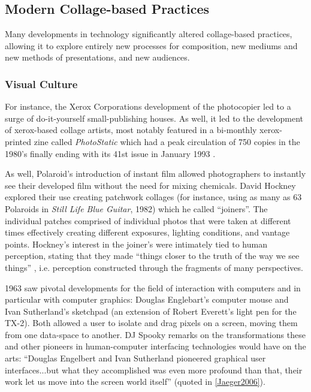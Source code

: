 \documentclass[a4paper,10pt,final]{ThesisStyle}
\begin{document}
\subsection{Modern Collage-based Practices}
Many developments in technology significantly altered collage-based practices, allowing it to explore entirely new processes for composition, new mediums and new methods of presentations, and new audiences. 

\subsubsection{Visual Culture}
For instance, the Xerox Corporations development of the photocopier led to a surge of do-it-yourself small-publishing houses.  As well, it led to the development of xerox-based collage artists, most notably featured in a bi-monthly xerox-printed zine called \textit{PhotoStatic} which had a peak circulation of 750 copies in the 1980's finally ending with its 41st issue in January 1993 \cite{McLeod2011}.  

As well, Polaroid's introduction of instant film allowed photographers to instantly see their developed film without the need for mixing chemicals.  David Hockney explored their use creating patchwork collages (for instance, using as many as 63 Polaroids in \textit{Still Life Blue Guitar}, 1982) which he called ``joiners''.  The individual patches comprised of individual photos that were taken at different times effectively creating different exposures, lighting conditions, and vantage points.  Hockney's interest in the joiner's were intimately tied to human perception, stating that they made ``things closer to the truth of the way we see things'' \cite{Joyce1988}, i.e. perception constructed through the fragments of many perspectives.

1963 saw pivotal developments for the field of interaction with computers and in particular with computer graphics: Douglas Englebart's computer mouse and Ivan Sutherland's sketchpad (an extension of Robert Everett's light pen for the TX-2).  Both allowed a user to isolate and drag pixels on a screen, moving them from one data-space to another.  DJ Spooky remarks on the transformations these and other pioneers in human-computer interfacing technologies would have on the arts: ``Douglas Engelbert and Ivan Sutherland pioneered graphical user interfaces...but what they accomplished was even more profound than that, their work let us move into the screen world itself'' (quoted in \ref{Jaeger2006}).  
\end{document}
